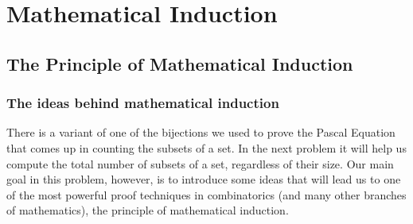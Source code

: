 \chapter{Mathematical Induction}\label{Induction}
\section{The Principle of Mathematical Induction}
\subsection{The ideas behind mathematical induction}
There is a variant of one of  the bijections we used to prove the Pascal
Equation that comes up in counting the subsets of a set. In the next
problem it will help us compute the total number of subsets of a set,
regardless of their size.  Our main goal in this problem, however, is to
introduce some ideas that will  lead us to one of the most powerful proof
techniques in combinatorics (and many other branches of mathematics), the
principle of mathematical induction.
\bp
\item \label{subsetsbysmallestcounterexample}

